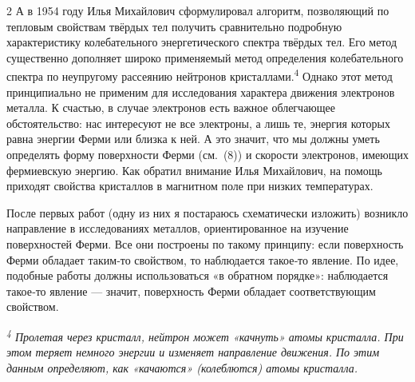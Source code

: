 \documentclass[a4paper,10pt]{article}
\begin{document}
\begin{minipage}[t]{0.64\textwidth}
  \begin{multicols}{2}
  \raggedcolumns
  А в 1954 году Илья Михайлович сформулировал алгоритм, позволяющий
  по тепловым свойствам твёрдых тел получить сравнительно подробную
  характеристику колебательного энергетического спектра твёрдых тел.
  Его метод существенно дополняет широко применяемый метод определения
  колебательного спектра по неупругому рассеянию нейтронов кристаллами.\textsuperscript{4}
  Однако этот метод принципиально не применим для исследования характера
  движения электронов металла. К счастью, в случае электронов есть важное
  облегчающее обстоятельство: нас интересуют не все электроны, а лишь те,
  энергия которых равна энергии Ферми или близка к ней. А это значит, что
  мы должны уметь определять форму поверхности Ферми (см.~(8)) и скорости
  электронов, имеющих фермиевскую энергию. Как обратил внимание Илья
  Михайлович, на помощь приходят свойства кристаллов в магнитном поле
  при низких температурах.

  После первых работ (одну из них я постараюсь схематически изложить)
  возникло направление в исследованиях металлов, ориентированное на
  изучение поверхностей Ферми. Все они построены по такому принципу:
  если поверхность Ферми обладает таким‑то свойством, то наблюдается
  такое‑то явление. По идее, подобные работы должны использоваться
  «в обратном порядке»: наблюдается такое‑то явление — значит, поверхность
  Ферми обладает соответствующим свойством.

  \small
  \noindent\makebox[0.5\linewidth]{\hrulefill}

  \textit{\textsuperscript{4} Пролетая через кристалл, нейтрон может «качнуть»
  атомы кристалла. При этом теряет немного энергии и изменяет направление
  движения. По этим данным определяют, как «качаются» (колеблются) атомы
  кристалла.}

  \normalsize
  \end{multicols}

\end{minipage}
\end{document}
